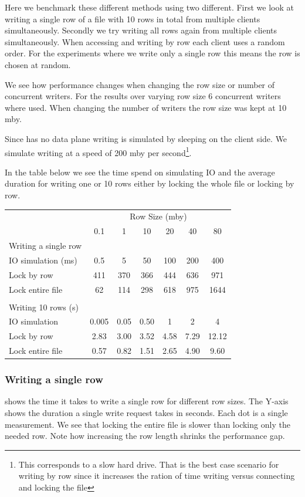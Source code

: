 Here we benchmark these different methods using two different. First we look at writing a single row of a file with 10 rows in total from multiple clients simultaneously. Secondly we try writing all rows again from multiple clients simultaneously. When accessing and writing by row each client uses a random order. For the experiments where we write only a single row this means the row is chosen at random.

We see how performance changes when changing the row size or number of concurrent writers. For the results over varying row size 6 concurrent writers where used. When changing the number of writers the row size was kept at 10 \ac{mby}.

Since \name{} has no data plane writing is simulated by sleeping on the client side. We simulate writing at a speed of 200 \ac{mby} per second\footnote{This corresponds to a slow hard drive. That is the best case scenario for writing by row since it increases the ration of time writing versus connecting and locking the file}.

In the table below we see the time spend on simulating IO and the average duration for writing one or 10 rows either by locking the whole file or locking by row.
%
\begin{tabular}{lcccccc} \toprule
	& \multicolumn{6}{c}{Row Size (\ac{mby})} \\ \cmidrule(r){2-7}
	                   & 0.1 & 1 & 10 & 20 & 40 & 80 \\ \midrule
	Writing a single row  \\ \cmidrule(r){1-1}
	IO simulation (ms) & 0.5          & 5          & 50          & 100         & 200         & 400 \\
	Lock by row & 411 & 370 & 366 & 444 & 636 & 971\\
	Lock entire file & 62 & 114 & 298 & 618 & 975 & 1644 \\
\smallskip \\
	Writing 10 rows (s)\\ \cmidrule(r){1-1}
	IO simulation & 0.005          & 0.05          & 0.50          & 1         & 2         & 4 \\
	Lock by row & 2.83         & 3.00       & 3.52        & 4.58        & 7.29        & 12.12 \\
	Lock entire file & 0.57         & 0.82       & 1.51        & 2.65        & 4.90        & 9.60 \\ \bottomrule
\end{tabular}
%
\subsubsection{Writing a single row}
%
 shows the time it takes to write a single row for different row sizes. The Y-axis shows the duration a single write request takes in seconds. Each dot is a single measurement. We see that locking the entire file is slower than locking only the needed row. Note how increasing the row length shrinks the performance gap.

